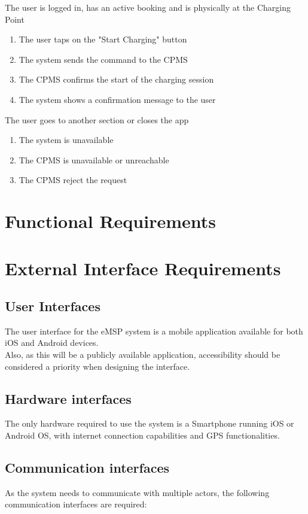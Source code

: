 \begin{enumerate}
	{The user is logged in, has an active booking and is physically at the Charging Point}
	{
	\begin{enumerate}[1.]
	\item The user taps on the "Start Charging" button
	\item The system sends the command to the CPMS
	\item The CPMS confirms the start of the charging session
	\item The system shows a confirmation message to the user
	\end{enumerate}
	}
	{The user goes to another section or closes the app}
	{
	\begin{enumerate}[1.]
	\item The system is unavailable
	\item The CPMS is unavailable or unreachable
	\item The CPMS reject the request
	\end{enumerate}
	}
	
	
\end{enumerate}


\section{Functional Requirements}

\section{External Interface Requirements}
\subsection{User Interfaces}
The user interface for the eMSP system is a mobile application available for both iOS and Android devices.\\
Also, as this will be a publicly available application, accessibility should be considered a priority when designing the interface.

\subsection{Hardware interfaces}
The only hardware required to use the system is a Smartphone running iOS or Android OS, with internet connection capabilities and GPS functionalities.

\subsection{Communication interfaces}
As the system needs to communicate with multiple actors, the following communication interfaces are required:

